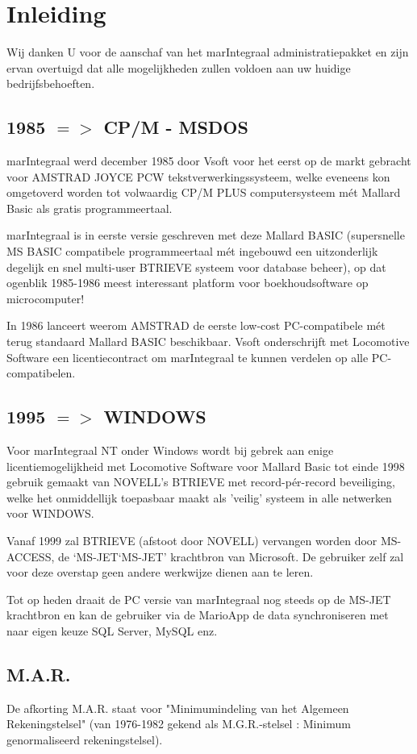 \documentclass[12pt]{report} %
\begin{document}
\tableofcontents

\chapter{Inleiding}
Wij danken U voor de aanschaf van het marIntegraal administratiepakket en zijn ervan
overtuigd dat alle mogelijkheden zullen voldoen aan uw huidige bedrijfsbehoeften.

\section{1985 $=>$ CP/M - MSDOS}
marIntegraal werd december 1985 door Vsoft voor het eerst op de markt gebracht voor
AMSTRAD JOYCE PCW tekstverwerkingssysteem, welke eveneens kon omgetoverd worden tot
volwaardig CP/M PLUS computersysteem mét Mallard Basic als gratis programmeertaal.

marIntegraal is in eerste versie geschreven met deze Mallard BASIC (supersnelle
MS BASIC compatibele programmeertaal mét ingebouwd een uitzonderlijk degelijk en snel
multi-user BTRIEVE systeem voor database beheer), op dat ogenblik 1985-1986 meest
interessant platform voor boekhoudsoftware op microcomputer!

In 1986 lanceert weerom AMSTRAD de eerste low-cost PC-compatibele mét terug standaard
Mallard BASIC beschikbaar. Vsoft onderschrijft met Locomotive Software een
licentiecontract om marIntegraal te kunnen verdelen op alle PC-compatibelen.

\section{1995 $=>$ WINDOWS}
Voor marIntegraal NT onder Windows wordt bij gebrek aan enige licentiemogelijkheid
met Locomotive Software voor Mallard Basic tot einde 1998 gebruik gemaakt van
NOVELL's BTRIEVE met record-pér-record beveiliging, welke het onmiddellijk toepasbaar
maakt als 'veilig' systeem in alle netwerken voor WINDOWS.

Vanaf 1999 zal BTRIEVE (afstoot door NOVELL) vervangen worden door MS-ACCESS,
de ‘MS-JET‘MS-JET’ krachtbron van Microsoft. De gebruiker zelf zal voor deze overstap
geen andere werkwijze dienen aan te leren.

Tot op heden draait de PC versie van marIntegraal nog steeds op de MS-JET krachtbron
en kan de gebruiker via de MarioApp de data synchroniseren met naar eigen keuze
SQL Server, MySQL enz.

\section{M.A.R.}
De afkorting M.A.R. staat voor "Minimumindeling van het Algemeen Rekeningstelsel"
(van 1976-1982 gekend als M.G.R.-stelsel : Minimum genormaliseerd rekeningstelsel).
\end{document}
